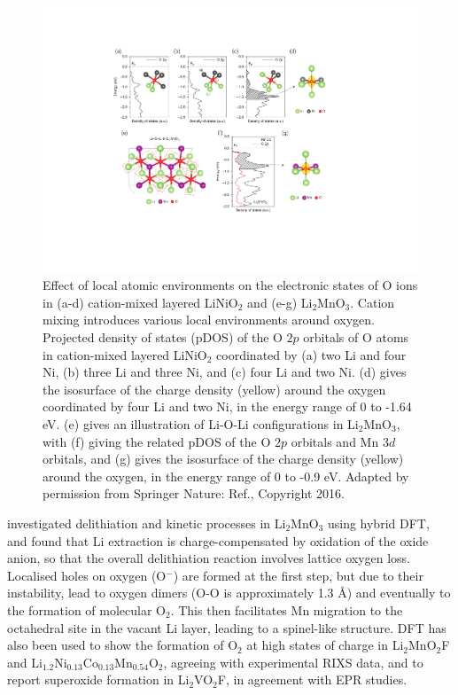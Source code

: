 \documentclass[../main.tex]{subfiles}
\begin{document}
\begin{figure}
    \centering
    \includegraphics[scale=0.7]{figures/o_redox.pdf}
    \caption{ Effect of local atomic environments on the electronic states of O ions in (a-d) cation-mixed layered LiNiO$_2$ and (e-g) Li$_2$MnO$_3$. Cation mixing introduces various local environments around oxygen. Projected density of states (pDOS) of the O $2p$ orbitals of O atoms in cation-mixed layered LiNiO$_2$ coordinated by (a) two Li and four Ni, (b) three Li and three Ni, and (c) four Li and two Ni. (d) gives the isosurface of the charge density (yellow) around the oxygen coordinated by four Li and two Ni, in the energy range of 0 to -1.64 eV. (e) gives an illustration of Li-O-Li configurations in Li$_2$MnO$_3$, with (f) giving the related pDOS of the O $2p$ orbitals and Mn $3d$ orbitals, and (g) gives the isosurface of the charge density (yellow) around the oxygen, in the energy range of 0 to -0.9 eV. Adapted by permission from Springer Nature: Ref., Copyright 2016.}
    \label{fig:o_redox}
\end{figure}

\citeauthor{Chen2016} investigated delithiation and kinetic processes in Li$_2$MnO$_3$ using hybrid DFT, and found that Li extraction is charge-compensated by oxidation of the oxide anion, so that the overall delithiation reaction involves lattice oxygen loss.\cite{Chen2016} Localised holes on oxygen (O$^-$) are formed at the first step, but due to their instability, lead to oxygen dimers (O-O is approximately 1.3 \AA) and eventually to the formation of molecular O$_2$. This then facilitates Mn migration to the octahedral site in the vacant Li layer, leading to a spinel-like structure. DFT has also been used to show the formation of O$_2$ at high states of charge in Li$_2$MnO$_2$F\cite{Sharpe2020} and Li$_{1.2}$Ni$_{0.13}$Co$_{0.13}$Mn$_{0.54}$O$_2$, \cite{House2020a} agreeing with experimental RIXS data, and to report superoxide formation in Li$_2$VO$_2$F, in agreement with EPR studies.\cite{Chang2020}
\end{document}
